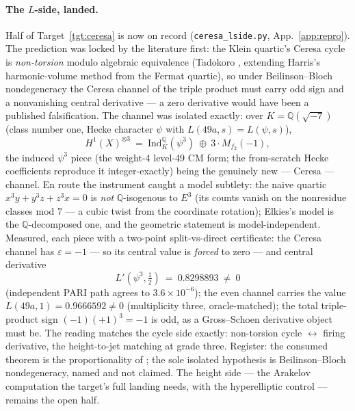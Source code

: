 \documentclass[11pt]{article}
\theoremstyle{definition}
\theoremstyle{remark}
\begin{document}
\paragraph{The $L$-side, landed.} Half of Target~\ref{tgt:ceresa} is now on
record (\texttt{ceresa\_lside.py}, App.~\ref{app:repro}). The prediction was
locked by the literature first: the Klein quartic's Ceresa cycle is
\emph{non-torsion} modulo algebraic equivalence (Tadokoro \cite{Tadokoro},
extending Harris's harmonic-volume method \cite{Harris} from the Fermat
quartic), so under Beilinson--Bloch nondegeneracy the Ceresa channel of the
triple product must carry odd sign and a nonvanishing central derivative --- a
zero derivative would have been a published falsification. The channel was
isolated exactly: over $K=\mathbb Q(\sqrt{-7})$ (class number one, Hecke
character $\psi$ with $L(49a,s)=L(\psi,s)$),
\[
  H^1(X)^{\otimes3}\ =\ \mathrm{Ind}_K^{\mathbb Q}(\psi^3)\ \oplus\
  3\cdot M_{f_2}(-1),
\]
the induced $\psi^3$ piece (the weight-4 level-49 CM form; the from-scratch
Hecke coefficients reproduce it integer-exactly) being the genuinely new ---
Ceresa --- channel. En route the instrument caught a model subtlety: the naive
quartic $x^3y+y^3z+z^3x=0$ is \emph{not} $\mathbb Q$-isogenous to $E^3$ (its
counts vanish on the nonresidue classes mod $7$ --- a cubic twist from the
coordinate rotation); Elkies's model \cite{Elkies} is the
$\mathbb Q$-decomposed one, and the geometric statement is model-independent.
Measured, each piece with a two-point split-vs-direct certificate: the Ceresa
channel has $\varepsilon=-1$ --- so its central value is \emph{forced} to zero
--- and central derivative
\[
  L'(\psi^3,\tfrac12)\ =\ 0.8298893\ \ne\ 0
\]
(independent PARI path agrees to $3.6\times10^{-6}$); the even channel carries
the value $L(49a,1)=0.9666592\ne0$ (multiplicity three, oracle-matched); the
total triple-product sign $(-1)(+1)^3=-1$ is odd, as a Gross--Schoen derivative
object must be. The reading matches the cycle side exactly: non-torsion cycle
$\leftrightarrow$ firing derivative, the height-to-jet matching at grade
three. Register: the consumed theorem is the proportionality of
\cite{ZhangGS,YZZ}; the sole isolated hypothesis is Beilinson--Bloch
nondegeneracy, named and not claimed. The height side --- the Arakelov
computation the target's full landing needs, with the hyperelliptic control
--- remains the open half.
\end{document}

